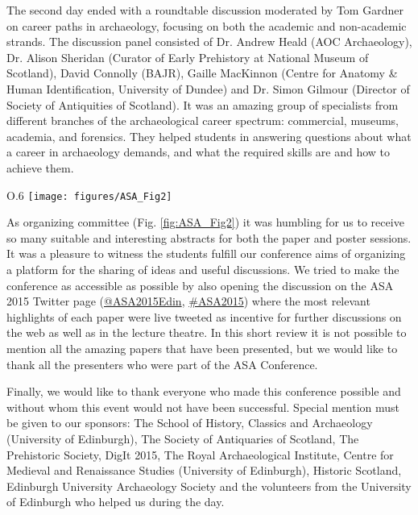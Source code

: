 The second day ended with a roundtable discussion moderated by Tom Gardner on career paths in archaeology, focusing on both the academic and non-academic strands. 
The discussion panel consisted of Dr. Andrew Heald (AOC Archaeology), Dr. Alison Sheridan (Curator of Early Prehistory at National Museum of Scotland), David Connolly (BAJR), 
Gaille MacKinnon (Centre for Anatomy \& Human Identification, University of Dundee) and Dr. Simon Gilmour (Director of Society of Antiquities of Scotland). 
It was an amazing group of specialists from different branches of the archaeological career spectrum: commercial, museums, academia, and forensics. 
They helped students in answering questions about what a career in archaeology demands, and what the required skills are and how to achieve them.

\begin{wrapfigure}{O}{.6\textwidth}%
	\texttt{[image: figures/ASA\_Fig2]}
	\caption{Organising committee (from left to right): Marta Lorenzon, Ulle Aguraiuja, Cindy Nelson-Viljoen, Rachel Faulkner-Jones.}
	\label{fig:ASA_Fig2}
\end{wrapfigure}	

As organizing committee (Fig. \ref{fig:ASA_Fig2}) it was humbling for us to receive so many suitable and interesting abstracts for both the paper and poster sessions. 
It was a pleasure to witness the students fulfill our conference aims of organizing a platform for the sharing of ideas and useful discussions. We tried to make the conference as accessible as possible by also opening the discussion on the ASA 2015 Twitter page (\href{https://twitter.com/asa2015edin}{@ASA2015Edin}, \href{https://twitter.com/search?q=\%23asa2015\&lang=en}{\#ASA2015}) where the most relevant highlights of each paper were live tweeted as incentive for further discussions on the web as well as in the lecture theatre. In this short review it is not possible to mention all the amazing papers that have been presented, but we would like to thank all the presenters who were part of the  ASA Conference.

	
Finally, we would like to thank everyone who made this conference possible and without whom this event would not have been successful. Special mention must be given to our sponsors: The School of History, Classics and Archaeology (University of Edinburgh), The Society of Antiquaries of Scotland, The Prehistoric Society, DigIt 2015, The Royal Archaeological Institute, Centre for Medieval and Renaissance Studies (University of Edinburgh), Historic Scotland, Edinburgh University Archaeology Society and the volunteers from the University of Edinburgh who helped us during the day.
\label{ASA:lastpage}
\closingarticle
\endinput
